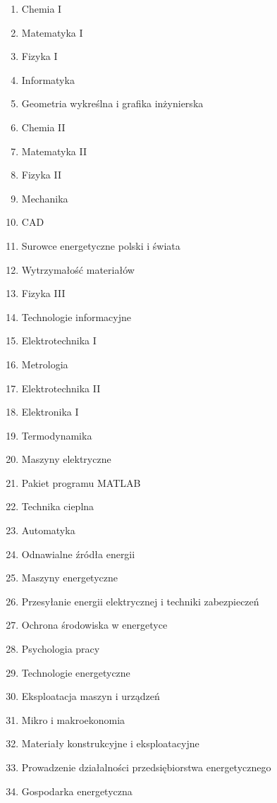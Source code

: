 \documentclass[a4paper,12pt]{article}
\begin{document}
\begin{multicols}{2}
\begin{enumerate}
\item Chemia I
\item Matematyka I
\item Fizyka I
\item Informatyka
\item Geometria wykreślna i grafika inżynierska
\item Chemia II
\item Matematyka II
\item Fizyka II
\item Mechanika
\item CAD
\item Surowce energetyczne polski i świata
\item Wytrzymałość materiałów
\item Fizyka III
\item Technologie informacyjne
\item Elektrotechnika I
\item Metrologia
\item Elektrotechnika II
\item Elektronika I
\item Termodynamika
\item Maszyny elektryczne
\item Pakiet programu MATLAB
\item Technika cieplna
\item Automatyka
\item Odnawialne źródła energii
\item Maszyny energetyczne
\item Przesyłanie energii elektrycznej i techniki zabezpieczeń
\item Ochrona środowiska w energetyce
\item Psychologia pracy
\item Technologie energetyczne
\item Eksploatacja maszyn i urządzeń
\item Mikro i makroekonomia
\item Materiały konstrukcyjne i eksploatacyjne
\item Prowadzenie działalności przedsiębiorstwa energetycznego
\item Gospodarka energetyczna
\end{enumerate}
\end{multicols}
\end{document}
